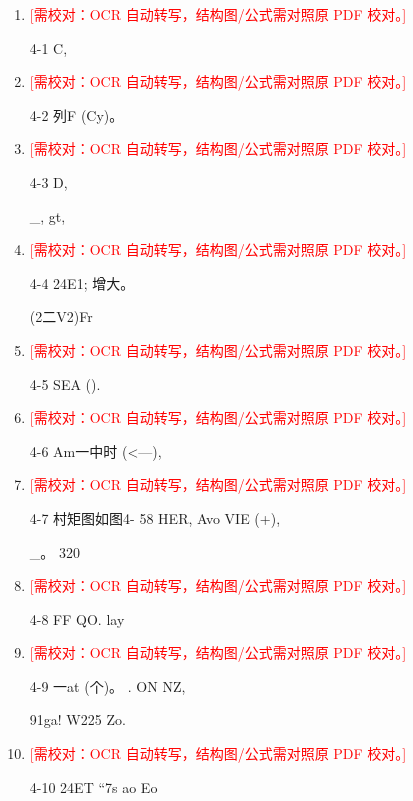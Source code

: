 \documentclass[UTF8,12pt,a4paper,openany]{ctexbook}
\newcommand{\TODO}[1]{\textcolor{red}{[需校对：#1]}}
\begin{document}
\begin{enumerate}[label=\textbf{\arabic*.},leftmargin=2em]
\item \TODO{OCR 自动转写，结构图/公式需对照原 PDF 校对。}\par 4-1 C,
\item \TODO{OCR 自动转写，结构图/公式需对照原 PDF 校对。}\par 4-2 列F (Cy)。
\item \TODO{OCR 自动转写，结构图/公式需对照原 PDF 校对。}\par 4-3 D,\par \_, gt,
\item \TODO{OCR 自动转写，结构图/公式需对照原 PDF 校对。}\par 4-4 24E1; 增大。\par (2二V2)Fr
\item \TODO{OCR 自动转写，结构图/公式需对照原 PDF 校对。}\par 4-5    SEA   ().
\item \TODO{OCR 自动转写，结构图/公式需对照原 PDF 校对。}\par 4-6 Am一中时 (<—),
\item \TODO{OCR 自动转写，结构图/公式需对照原 PDF 校对。}\par 4-7 村矩图如图4- 58 HER, Avo VIE (+),\par \_。 320
\item \TODO{OCR 自动转写，结构图/公式需对照原 PDF 校对。}\par 4-8 FF QO.                                 lay
\item \TODO{OCR 自动转写，结构图/公式需对照原 PDF 校对。}\par 4-9 一at (个)。            .                                ON NZ,\par 91ga!                                             W225    Zo.
\item \TODO{OCR 自动转写，结构图/公式需对照原 PDF 校对。}\par 4-10 24ET “7s                                  ao Eo

\end{enumerate}
\end{document}
